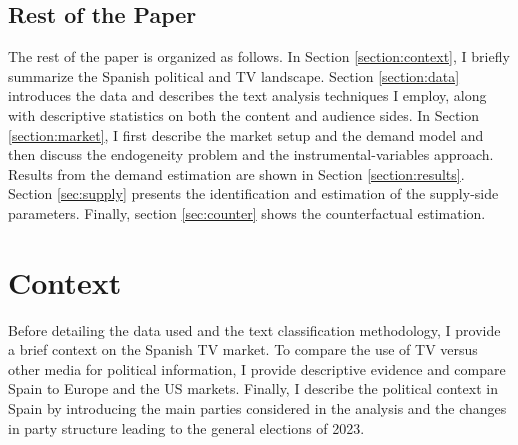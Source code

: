 \documentclass[12pt]{article}
\begin{document}

\subsection*{Rest of the Paper}

The rest of the paper is organized as follows. In Section \ref{section:context}, I briefly summarize the Spanish political and TV landscape. Section \ref{section:data} introduces the data and describes the text analysis techniques I employ, along with descriptive statistics on both the content and audience sides. In Section \ref{section:market}, I first describe the market setup and the demand model and then discuss the endogeneity problem and the instrumental-variables approach. Results from the demand estimation are shown in Section \ref{section:results}.  Section \ref{sec:supply} presents the identification and estimation of the supply-side parameters. Finally, section \ref{sec:counter} shows the counterfactual estimation. 

	
	
	\section{Context}
	
	Before detailing the data used and the text classification methodology, I provide a brief context on the Spanish TV market. To compare the use of TV versus other media for political information, I provide descriptive evidence and compare Spain to Europe and the US markets.  Finally, I describe the political context in Spain by introducing the main parties considered in the analysis and the changes in party structure leading to the general elections of 2023.
	
\end{document}
